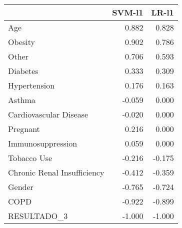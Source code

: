 \begin{tabular}{lrr}
\toprule
{} &  SVM-l1 &  LR-l1 \\
\midrule
Age                         &   0.882 &  0.828 \\
Obesity                     &   0.902 &  0.786 \\
Other                       &   0.706 &  0.593 \\
Diabetes                    &   0.333 &  0.309 \\
Hypertension                &   0.176 &  0.163 \\
Asthma                      &  -0.059 &  0.000 \\
Cardiovascular Disease      &  -0.020 &  0.000 \\
Pregnant                    &   0.216 &  0.000 \\
Immunosuppression           &   0.059 &  0.000 \\
Tobacco Use                 &  -0.216 & -0.175 \\
Chronic Renal Insufficiency &  -0.412 & -0.359 \\
Gender                      &  -0.765 & -0.724 \\
COPD                        &  -0.922 & -0.899 \\
RESULTADO\_3                 &  -1.000 & -1.000 \\
\bottomrule
\end{tabular}
